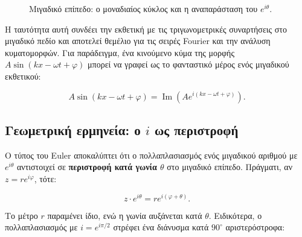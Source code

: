 \documentclass[a4paper, 11pt]{article}
\begin{document}
\begin{figure}[htbp]
\centering
{}
\caption{Μιγαδικό επίπεδο: ο μοναδιαίος κύκλος και η αναπαράσταση του $e^{i\theta}$.}
\label{fig:euler}
\end{figure}

Η ταυτότητα αυτή συνδέει την εκθετική με τις τριγωνομετρικές συναρτήσεις
στο μιγαδικό πεδίο και αποτελεί θεμέλιο για τις σειρές Fourier και την
ανάλυση κυματομορφών. Για παράδειγμα, ένα κινούμενο κύμα της μορφής
\(A\sin(kx - \omega t + \varphi)\) μπορεί να γραφεί ως το φανταστικό
μέρος ενός μιγαδικού εκθετικού:

\[
A\sin(kx - \omega t + \varphi) = \operatorname{Im}\left( A e^{i(kx - \omega t + \varphi)} \right).
\]

\subsection{\texorpdfstring{Γεωμετρική ερμηνεία: ο \(i\) ως
περιστροφή}{Γεωμετρική ερμηνεία: ο i ως περιστροφή}}\label{ux3b3ux3b5ux3c9ux3bcux3b5ux3c4ux3c1ux3b9ux3baux3ae-ux3b5ux3c1ux3bcux3b7ux3bdux3b5ux3afux3b1-ux3bf-i-ux3c9ux3c2-ux3c0ux3b5ux3c1ux3b9ux3c3ux3c4ux3c1ux3bfux3c6ux3ae}

Ο τύπος του Euler αποκαλύπτει ότι ο πολλαπλασιασμός ενός μιγαδικού
αριθμού με \(e^{i\theta}\) αντιστοιχεί σε \textbf{περιστροφή κατά γωνία
\(\theta\)} στο μιγαδικό επίπεδο. Πράγματι, αν \(z = r e^{i\varphi}\),
τότε:

\[
z \cdot e^{i\theta} = r e^{i(\varphi + \theta)}.
\]

Το μέτρο \(r\) παραμένει ίδιο, ενώ η γωνία αυξάνεται κατά \(\theta\).
Ειδικότερα, ο πολλαπλασιασμός με \(i = e^{i\pi/2}\) στρέφει ένα διάνυσμα
κατά \(90^\circ\) αριστερόστροφα:
\end{document}

